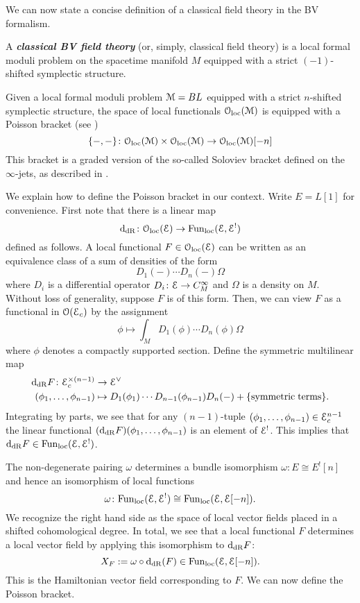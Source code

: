 \documentclass[10pt, oneside]{article}
\newcommand{\defterm}[1]{\textbf{\emph{#1}}}
\begin{document}
We can now state a concise definition of a classical field theory in the BV formalism.

\begin{definition}
A \defterm{classical BV field theory} (or, simply, classical field theory) is a local formal moduli problem on the spacetime manifold $M$ equipped with a strict $(-1)$-shifted symplectic structure.
\label{def:classicalfieldtheory}
\end{definition}

Given a local formal moduli problem $\mathcal M = BL$ equipped with a strict $n$-shifted symplectic structure, the space of local functionals $\mathcal{O}_{\rm loc}(\mathcal M)$ is equipped with a Poisson bracket (see \cite[Chapter 5.3]{CostelloBook}) 
\[
\{-,-\}\colon \mathcal{O}_{\rm loc}(\mathcal M) \times \mathcal{O}_{\rm loc}(\mathcal M) \to \mathcal{O}_{\rm loc}(\mathcal M)[-n]
\]
This bracket is a graded version of the so-called Soloviev bracket \cite{Soloviev} defined on the $\infty$-jets, as described in \cite[Section 4]{GetzlerBracket}. 

We explain how to define the Poisson bracket in our context. Write $E = L[1]$ for convenience. First note that there is a linear map
\[
{\rm d}_{\mathrm{dR}} \colon \mathcal{O}_{\rm loc}(\mathcal E) \to {\rm Fun}_{\rm loc}(\mathcal E, \mathcal E^!) 
\]
defined as follows. 
A local functional $F \in  \mathcal{O}_{\rm loc}(\mathcal E)$ can be written as an equivalence class of a sum of densities of the form
\[
D_1(-) \cdots D_n(-) \Omega
\]
where $D_i$ is a differential operator $D_i \colon \mathcal E \to C^\infty_M$ and $\Omega$ is a density on $M$. 
Without loss of generality, suppose $F$ is of this form. 
Then, we can view $F$ as a functional in $\mathcal O(\mathcal E_c)$ by the assignment
\[
\phi \mapsto \int_M D_1(\phi) \cdots D_n(\phi) \Omega
\]
where $\phi$ denotes a compactly supported section. 
Define the symmetric multilinear map
\begin{align*}
{\rm d}_{\mathrm{dR}} F  \colon  \mathcal E_c^{\times (n-1)} & \to  \mathcal E^\vee \\
 (\phi_1, \ldots, \phi_{n-1}) & \mapsto  D_1(\phi_1) \cdots D_{n-1}(\phi_{n-1}) D_{n} (-) + \{{\rm symmetric\;terms}\} .
\end{align*}
Integrating by parts, we see that for any $(n-1)$-tuple $(\phi_1, \ldots, \phi_{n-1}) \in \mathcal E_c^{n-1}$ the linear functional $({\rm d}_{\mathrm{dR}} F) (\phi_1,\ldots, \phi_{n-1})$ is an element of $\mathcal E^!$. 
This implies that ${\rm d}_{\mathrm{dR}} F \in {\rm Fun}_{\rm loc}(\mathcal E, \mathcal E^!)$.

The non-degenerate pairing $\omega$ determines a bundle isomorphism $\omega \colon E \cong E^! [n]$ and hence an isomorphism of local functions
\[
\omega \colon {\rm Fun}_{\rm loc}(\mathcal E, \mathcal E^!) \cong {\rm Fun}_{\rm loc}(\mathcal E, \mathcal E[-n]) .
\]
We recognize the right hand side as the space of local vector fields placed in a shifted cohomological degree.
In total, we see that a local functional $F$ determines a local vector field by applying this isomorphism to ${\rm d}_{\mathrm{dR}}F$:
\[
X_F := \omega \circ {\rm d}_{\mathrm{dR}} (F) \in  {\rm Fun}_{\rm loc}(\mathcal E, \mathcal E[-n])  .
\]
This is the Hamiltonian vector field corresponding to $F$.  We can now define the Poisson bracket.
\end{document}

